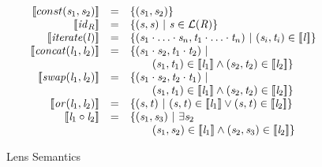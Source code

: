 \documentclass[numbers]{sigplanconf}
\begin{document}
\begin{figure}
\[
\begin{array}{rcl}
\SemanticsOf{const(\String_1,\String_2)} &=& \SetOf{(\String_1,\String_2)}\\

\SemanticsOf{\IdentityLensOf{\Regex}} &=& \SetOf{(\String,\String)\SuchThat\String\in\LanguageOf{\Regex}}\\

\SemanticsOf{\IterateLensOf{\Lens}} &=& \SetOf{(\String_1\Concat\ldots\Concat\String_n,
\StringAlt_1\Concat\ldots\Concat\StringAlt_n)\SuchThat
(\String_i,\StringAlt_i)\in\SemanticsOf{\Lens}}\\

\SemanticsOf{\ConcatLensOf{\Lens_1}{\Lens_2}} &=&
\SetOf{(\String_1\Concat\String_2,\StringAlt_1\Concat\StringAlt_2)\SuchThat\\
& & \hspace*{2em}(\String_1,\StringAlt_1)\in\SemanticsOf{\Lens_1}\BooleanAnd
(\String_2,\StringAlt_2)\in\SemanticsOf{\Lens_2}}\\

\SemanticsOf{\SwapLensOf{\Lens_1}{\Lens_2}} &=&
\SetOf{(\String_1\Concat\String_2,\StringAlt_2\Concat\StringAlt_1)\SuchThat\\
& & \hspace*{2em}(\String_1,\StringAlt_1)\in\SemanticsOf{\Lens_1}\BooleanAnd
(\String_2,\StringAlt_2)\in\SemanticsOf{\Lens_2}}\\

\SemanticsOf{\OrLensOf{\Lens_1}{\Lens_2}} &=&
\SetOf{(\String,\StringAlt)
\SuchThat(\String,\StringAlt)\in\SemanticsOf{\Lens_1}
\BooleanOr(\String,\StringAlt)\in\SemanticsOf{\Lens_2}}\\

\SemanticsOf{\ComposeLensOf{\Lens_1}{\Lens_2}} &=&
\SetOf{(\String_1,\String_3)\SuchThat\exists\String_2\\
& & \hspace*{2em}(\String_1,\String_2)\in\SemanticsOf{\Lens_1}\BooleanAnd
(\String_2,\String_3)\in\SemanticsOf{\Lens_2}}
\end{array}
\]
\caption{Lens Semantics}
\label{fig:lens-semantics}
\end{figure}
\end{document}
